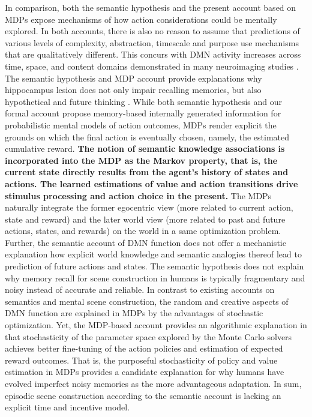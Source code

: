 \documentclass[10pt,letterpaper]{article}
\begin{document}
In comparison,
both the semantic hypothesis and the present account based on MDPs
expose mechanisms of how action considerations could be mentally explored.
In both accounts,
there is also no reason to assume that predictions of various
levels of complexity, abstraction, timescale and purpose
use mechanisms that are qualitatively different. This concurs with
DMN activity increases across time, space, and content domains
demonstrated in many neuroimaging studies
\citep{spreng2009common, laird2009, bzdok2012morality, binder2009}.
The semantic hypothesis
and MDP account provide explanations why hippocampus lesion does
not only impair recalling memories, but also hypothetical and future
thinking \citep{hassabis2007patients}.
While both semantic hypothesis and
our formal account propose memory-based internally
generated information for probabilistic mental models of action outcomes,
MDPs render explicit the grounds on which the final action is
eventually chosen, namely, the estimated cumulative reward.
\textbf{The notion of semantic knowledge associations is
incorporated into the MDP as the Markov property,
that is, the current state directly results from the
agent's history of states and actions. The learned
estimations of value and action transitions drive
stimulus processing and action choice in the present.}
The MDPs naturally integrate the former egocentric view
(more related to current action, state and reward) and the later
world view (more related to past and future actions, states, and rewards)
on the world in a same optimization problem.
Further,
the semantic account of DMN function does not offer
a mechanistic explanation how explicit world knowledge and semantic analogies thereof
lead to prediction of future actions and states.
The semantic hypothesis does not explain why memory recall
for scene construction in humans is typically fragmentary and noisy
instead of accurate and reliable.
In contrast to existing accounts on semantics and
mental scene construction, the random and creative aspects of DMN function
are explained in MDPs by the advantages of stochastic optimization.
Yet, the MDP-based account provides an algorithmic explanation in that
stochasticity of the parameter space explored
by the Monte Carlo solvers achieves better fine-tuning of the
action policies and estimation of expected reward outcomes.
That is, the purposeful stochasticity of policy and value estimation
in MDPs provides a candidate explanation for why humans
have evolved imperfect noisy memories
as the more advantageous adaptation.
In sum, episodic scene construction according to the semantic
account is lacking an explicit time and incentive model.
\end{document}
